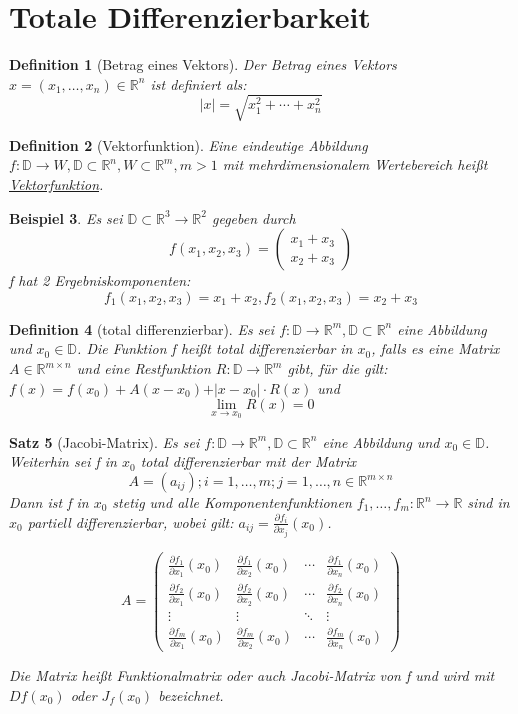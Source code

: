 \documentclass[12pt,a4paper]{scrreprt}
\newtheorem{defi}{Definition}[section]
\newtheorem{beispiel}[defi]{Beispiel}
\newtheorem{satz}[defi]{Satz}
\begin{document}
\section{Totale Differenzierbarkeit}

\begin{defi}[Betrag eines Vektors]
	Der Betrag eines Vektors $x=(x_1,\dots,x_n)\in\mathbb{R}^n$ ist definiert als:
	\[\vert x \vert = \sqrt{x_1^2+\cdots+x_n^2}\]
\end{defi}

\begin{defi}[Vektorfunktion]
	Eine eindeutige Abbildung $f:\mathbb{D}\to W,\mathbb{D}\subset\mathbb{R}^n,W\subset\mathbb{R}^m,m>1$ mit mehrdimensionalem Wertebereich heißt \underline{Vektorfunktion}.
\end{defi}

\begin{beispiel}
	Es sei $\mathbb{D}\subset\mathbb{R}^3\to\mathbb{R}^2$ gegeben durch
	\[f(x_1,x_2,x_3)=\begin{pmatrix}
	x_1+x_3 \\ x_2+x_3
	\end{pmatrix}\]
	f hat 2 Ergebniskomponenten:
	\[f_1(x_1,x_2,x_3)=x_1+x_2,f_2(x_1,x_2,x_3)=x_2+x_3\]
\end{beispiel}

\begin{defi}[total differenzierbar]
	Es sei $f:\mathbb{D}\to \mathbb{R}^m,\mathbb{D}\subset\mathbb{R}^n$ eine Abbildung und $x_0\in\mathbb{D}$. Die Funktion f heißt total differenzierbar in $x_0$, falls es eine Matrix $A\in\mathbb{R}^{m\times n}$ und eine Restfunktion $R:\mathbb{D}\to\mathbb{R}^m$ gibt, für die gilt: $f(x)=f(x_0)+A(x-x_0)+\vert x-x_0 \vert\cdot R(x)$ und \[\lim_{x\to x_0} R(x)=0\]
\end{defi}

\begin{satz}[Jacobi-Matrix]
	Es sei $f:\mathbb{D}\to \mathbb{R}^m,\mathbb{D}\subset\mathbb{R}^n$ eine Abbildung und $x_0\in\mathbb{D}$. Weiterhin sei f in $x_0$ total differenzierbar mit der Matrix
	\[A=(a_{ij});i=1,\dots,m;j=1,\dots,n \in\mathbb{R}^{m\times n}\]
	Dann ist f in $x_0$ stetig und alle Komponentenfunktionen $f_1,\dots,f_m:\mathbb{R}^n\to\mathbb{R}$ sind in $x_0$ partiell differenzierbar, wobei gilt: $a_{ij}=\frac{\partial f_i}{\partial x_j}(x_0)$.
	
	\[A=\begin{pmatrix}
	\frac{\partial f_1}{\partial x_1}(x_0) & \frac{\partial f_1}{\partial x_2}(x_0) & \cdots & \frac{\partial f_1}{\partial x_n}(x_0) \\
	\frac{\partial f_2}{\partial x_1}(x_0) & \frac{\partial f_2}{\partial x_2}(x_0) & \cdots & \frac{\partial f_2}{\partial x_n}(x_0) \\
	\vdots & \vdots & \ddots & \vdots \\
	\frac{\partial f_m}{\partial x_1}(x_0) & \frac{\partial f_m}{\partial x_2}(x_0) & \cdots & \frac{\partial f_m}{\partial x_n}(x_0)
	\end{pmatrix}\]
	
	Die Matrix heißt Funktionalmatrix oder auch Jacobi-Matrix von f und wird mit $Df(x_0)$ oder $J_f(x_0)$ bezeichnet.
\end{satz}
\end{document}
